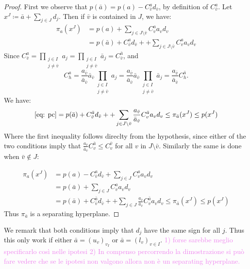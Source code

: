\documentclass{article}
\begin{document}
\begin{proof}
	First we observe that \(p(\bar{a}) = p(a) - C_{\bar{v}}^ad_{\bar{v}}\), by definition of \(C_{\bar{v}}^a\).
	 Let \(x^J \coloneqq \bar{a} + \sum_{j\in J}d_j\). Then if \(\bar{v}\) is contained in \(J\), we have:
\begin{align}
	\pi_a(x^J) &= p(a) + \sum_{j \in J \setminus{\bar{v}}} C_v^a a_v d_v\\
	&= p(\bar{a}) + C_{\bar{v}}^ad_{\bar{v}} +  + \sum_{j \in J \setminus{\bar{v}}} C_v^a a_v d_v \label{eq: pc}
\end{align}
Since \( C_{\bar{v}}^a = \prod_{\substack{j \in I \\ j \neq \bar{v}}}a_j = \prod_{\substack{j \in I \\ j \neq \bar{v}}}\bar{a}_j = C_{\bar{v}}^{\bar{a}}\), and 
 \[ C_{h}^a = \frac{a_{\bar{v}}}{\bar{a}_{\bar{v}}}\bar{a}_{\bar{v}}\prod_{\substack{j \in I \\ j \neq \bar{v}}}a_j = \frac{a_{\bar{v}}}{\bar{a}_{\bar{v}}}\bar{a}_{\bar{v}}\prod_{\substack{j \in I \\ j \neq \bar{v}}}\bar{a}_j =  \frac{a_{\bar{v}}}{\bar{a}_{\bar{v}}}C_{h}^{\bar{a}}.\]
 We have:
\begin{equation}
	\eqref{eq: pc} = p(\bar{a}) + C_{\bar{v}}^{\bar{a}}d_{\bar{v}} +  + \sum_{j \in J \setminus{\bar{v}}}  \frac{a_{\bar{v}}}{\bar{a}_{\bar{v}}} C_v^{\bar{a}} a_v d_v \leq \pi_{\bar{a}}(x^J) \leq p(x^J)
\end{equation}
Where the first inequality follows direclty from the hypothesis, since either of the two conditions imply that \( \frac{a_{\bar{v}}}{\bar{a}_{\bar{v}}} C_v^{\bar{a}} \leq C_v^{\bar{v}}\) for all \(v\) in \(J\setminus{\bar{v}}\).
Similarly the same is done when \(\bar{v} \notin J\):

\begin{align}
	\pi_a(x^J) &= p(a) - C_{\bar{v}}^ad_{\bar{v}}  + \sum_{j \in J} C_v^a a_v d_v \\
	&= p(\bar{a}) +  \sum_{j \in J } C_v^a a_v d_v  \\
	&= p(\bar{a}) + C_{\bar{v}}^{\bar{a}}d_{\bar{v}} +  + \sum_{j \in J }  \frac{a_{\bar{v}}}{\bar{a}_{\bar{v}}} C_v^{\bar{a}} a_v d_v \leq \pi_{\bar{a}}(x^J) \leq p(x^J)
\end{align}
Thus \(\pi_{\bar{a}}\) is a separating hyperplane.
\end{proof}

We remark that both conditions imply that \(d_j\) have the same sign for all \(j\). Thus this only work if either \(\bar{a} = (u_v)_{v_I}\) or \(\bar{a} = (l_v)_{v \in I}\). \textcolor{violet}{1) forse sarebbe meglio specificarlo così nelle ipotesi 2) In compenso percorrendo la dimostrazione si può fare vedere che se le ipotesi non valgono allora non è un separating hyperplane.}
\end{document}

